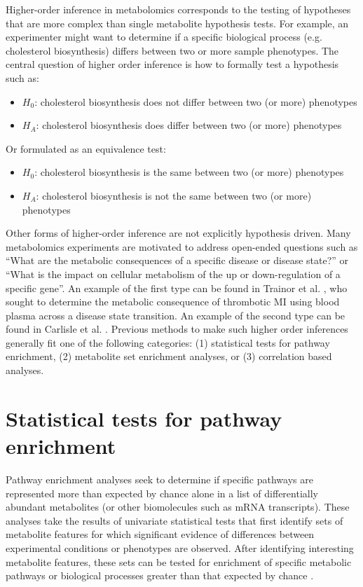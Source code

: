 \label{higher}
\begin{DoubleSpace*}
Higher-order inference in metabolomics corresponds to the testing of hypotheses that are more complex than single metabolite hypothesis tests. For example, an experimenter might want to determine if a specific biological process (e.g. cholesterol biosynthesis) differs between two or more sample phenotypes. The central question of higher order inference is how to formally test a hypothesis such as:
\begin{itemize}
	\item $H_0$: cholesterol biosynthesis does not differ between two (or more) phenotypes 
	\item $H_A$: cholesterol biosynthesis does differ between two (or more) phenotypes
\end{itemize} 
Or formulated as an equivalence test:
\begin{itemize}
	\item $H_0$: cholesterol biosynthesis is the same between two (or more) phenotypes 
	\item $H_A$: cholesterol biosynthesis is not the same between two (or more) phenotypes
\end{itemize}

Other forms of higher-order inference are not explicitly hypothesis driven. Many metabolomics experiments are motivated to address open-ended questions such as ``What are the metabolic consequences of a specific disease or disease state?'' or ``What is the impact on cellular metabolism of the up or down-regulation of a specific gene''. An example of the first type can be found in Trainor et al. \cite{trainor2017}, who sought to determine the metabolic consequence of thrombotic MI using blood plasma across a disease state transition. An example of the second type can be found in Carlisle et al. \cite{carlisle2016}. Previous methods to make such higher order inferences generally fit one of the following categories: (1) statistical tests for pathway enrichment, (2) metabolite set enrichment analyses, or (3) correlation based analyses. 

\section{Statistical tests for pathway enrichment}
Pathway enrichment analyses seek to determine if specific pathways are represented more than expected by chance alone in a list of differentially abundant metabolites (or other biomolecules such as mRNA transcripts). These analyses take the results of univariate statistical tests that first identify sets of metabolite features for which significant evidence of differences between experimental conditions or phenotypes are observed. After identifying interesting metabolite features, these sets can be tested for enrichment of specific metabolic pathways or biological processes greater than that expected by chance \cite{goeman2007,xia2010}. 


\end{DoubleSpace*}
